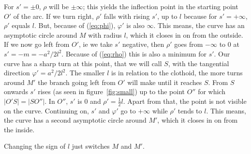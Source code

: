 \documentclass[12pt,a4paper]{scrartcl}
\begin{document}
For $s'=\pm0$, $\rho$ will be $\pm\infty$; this yields the inflection point in the starting point $O'$ of the arc.
If we turn right, $\rho'$ falls with rising $s'$, up to $l$ because for $s'=+\infty$, $\rho'$ equals $l$.
But, because of (\ref{eq:phi}), $\varphi'$ is also $\infty$.  This means, the curve has an asymptotic circle around $M$ with radius $l$, which it closes in on from the outside.
If we now go left from $O'$, ie we take $s'$ negative, then $\rho'$ goes from $-\infty$ to $0$ at $s'=-m=-a^2/2l^2$.
Because of (\ref{eq:rho}) this is also a minimum for $s'$.  Our curve has a sharp turn at this point, that we will call $S$, with the tangential direction $\varphi'=a^2/2l^2$.
The smaller $l$ is in relation to the clothoid, the more turns around $M'$ the branch going left from $O'$ will make until it reaches $S$.
From $S$ onwards $s'$ rises (as seen in figure~\ref{fig:small}) up to the point $O''$ for which $|O'S|=|SO''|$.
In $O''$, $s'$ is $0$ and $\rho'=\frac{1}{2}l$.  Apart from that, the point is not visible on the curve.
Continuing on, $s'$ and $\varphi'$ go to $+\infty$ while $\rho'$ tends to $l$.
This means, the curve has a second asymptotic circle around $M'$, which it closes in on from the inside.

Changing the sign of $l$ just switches $M$ and $M'$.
\end{document}
